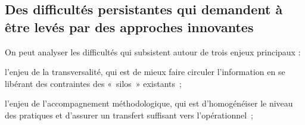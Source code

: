 









\subsection
{Des difficultés persistantes qui demandent à être levés par des approches
innovantes}

On peut analyser les difficultés qui subsistent
autour de trois enjeux principaux :

\startitemize

\item l'enjeu de la transversalité, qui est de mieux faire circuler l'information en
se libérant des contraintes des « silos » existants ;

\item l'enjeu de l'accompagnement méthodologique, qui est d'homogénéiser le niveau
des pratiques et d'assurer un transfert suffisant vers l'opérationnel ;

